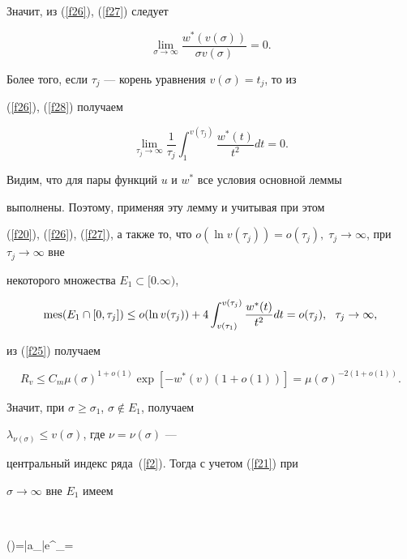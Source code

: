 Значит, из (\ref{f26}), (\ref{f27}) следует


$$


\lim_{\sigma\to\infty}\frac{w^{*}(v(\sigma))}{\sigma v(\sigma)}=0.


$$


Более того, если $\tau_{j}$ --- корень уравнения $v(\sigma)=t_{j}$, то из


(\ref{f26}), (\ref{f28}) получаем


$$


\lim_{\tau_{j}\to\infty}\frac{1}{\tau_{j}}\int_{1}^{v(\tau_{j})}


\frac{w^{*}(t)}{t^{2}}dt=0.


$$


Видим, что для пары функций $u$ и $w^{*}$ все условия основной леммы


выполнены. Поэтому, применяя эту лемму и учитывая при этом


(\ref{f20}), (\ref{f26}), (\ref{f27}), а также то, что $o(\ln


v(\tau_{j}))=o(\tau_{j}),\;\tau_{j}\to\infty$, при $\tau_{j}\to\infty$ вне


некоторого множества $E_{1}\subset[0.\infty)$,


\begin{equation}\label{f29}


\mes(E_{1}\cap[0,\tau_{j}])\leq o(\ln v(\tau_{j}))+


4\int_{v(\tau_{1})}^{v(\tau_{j})}\frac{w^{*}(t)}{t^{2}}dt=o(\tau_{j}),


\ \ \tau_{j}\to\infty,


\end{equation}


из (\ref{f25}) получаем


$$


R_{v}\leq C_{m}\mu(\sigma)^{1+o(1)}\exp[-w^{*}(v)(1+o(1))]


=\mu(\sigma)^{-2(1+o(1))}.


$$


Значит, при $\sigma\geq\sigma_{1}$, $\sigma\notin E_{1}$, получаем


$\lambda_{\nu(\sigma)}\leq v(\sigma)$, где $\nu=\nu(\sigma)$ ---


центральный индекс ряда~(\ref{f2}). Тогда с учетом (\ref{f21}) при


$\sigma\to\infty$ вне $E_{1}$ имеем


$$


\mu(\sigma)=|a_{\nu}|e^{\lambda_{\nu}\sigma}=



